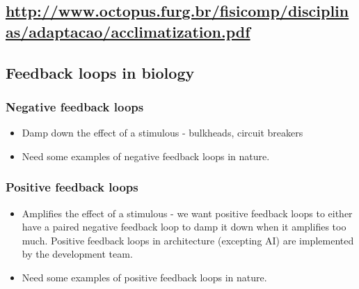 \documentclass[11pt]{article}
\begin{document}
\subsection{\url{http://www.octopus.furg.br/fisicomp/disciplinas/adaptacao/acclimatization.pdf}}
\label{sec:org6d1082c}

\subsection{Feedback loops in biology}
\label{sec:orgc74b74f}

\subsubsection{Negative feedback loops}
\label{sec:org3c8d20c}
\begin{itemize}
\item Damp down the effect of a stimulous - bulkheads, circuit breakers
\item Need some examples of negative feedback loops in nature.
\end{itemize}
\subsubsection{Positive feedback loops}
\label{sec:orgca4a57b}
\begin{itemize}
\item Amplifies the effect of a stimulous - we want positive feedback loops to either have a paired negative feedback loop to damp it down when it amplifies too much. Positive feedback loops in architecture (excepting AI) are implemented
by the development team.
\item Need some examples of positive feedback loops in nature.
\end{itemize}
\end{document}
